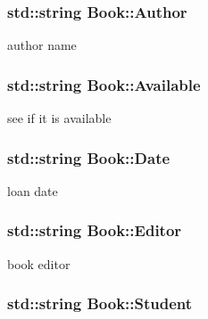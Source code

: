 \subsubsection[{\texorpdfstring{Author}{Author}}]{\setlength{\rightskip}{0pt plus 5cm}std\+::string Book\+::\+Author\hspace{0.3cm}{\ttfamily [private]}}\hypertarget{classBook_a12872f571d8e7c5bfa31f4142e7848eb}{}\label{classBook_a12872f571d8e7c5bfa31f4142e7848eb}


author name 

\subsubsection[{\texorpdfstring{Available}{Available}}]{\setlength{\rightskip}{0pt plus 5cm}std\+::string Book\+::\+Available\hspace{0.3cm}{\ttfamily [private]}}\hypertarget{classBook_ae5f0bbe5fb49a8cd68bfc77a59afed36}{}\label{classBook_ae5f0bbe5fb49a8cd68bfc77a59afed36}


see if it is available 

\subsubsection[{\texorpdfstring{Date}{Date}}]{\setlength{\rightskip}{0pt plus 5cm}std\+::string Book\+::\+Date\hspace{0.3cm}{\ttfamily [private]}}\hypertarget{classBook_a45a1a5f93a5ec021cc605b0c905d1d6f}{}\label{classBook_a45a1a5f93a5ec021cc605b0c905d1d6f}


loan date 

\subsubsection[{\texorpdfstring{Editor}{Editor}}]{\setlength{\rightskip}{0pt plus 5cm}std\+::string Book\+::\+Editor\hspace{0.3cm}{\ttfamily [private]}}\hypertarget{classBook_a18602b69a54cf1533569ac857681b03f}{}\label{classBook_a18602b69a54cf1533569ac857681b03f}


book editor 

\subsubsection[{\texorpdfstring{Student}{Student}}]{\setlength{\rightskip}{0pt plus 5cm}std\+::string Book\+::\+Student\hspace{0.3cm}{\ttfamily [private]}}\hypertarget{classBook_ae89daf9343a917dced86da884961ed3a}{}\label{classBook_ae89daf9343a917dced86da884961ed3a}


